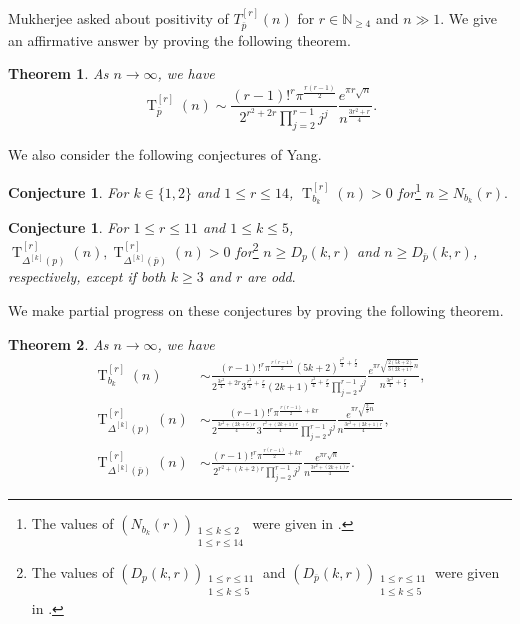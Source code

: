 \documentclass[11pt,reqno,a4paper]{amsart}
\renewcommand{\(}{\left\(}
\renewcommand{\)}{\right\)}
\newcommand{\pa}[2]{\left(\frac{#1}{#2}\right)}
\numberwithin{equation}{section}
\theoremstyle{plain}
\newtheorem{theorem}{Theorem}[section]
\theoremstyle{definition} %
\newcounter{specialstatement}
\newtheorem{conjecture}[specialstatement]{Conjecture}
\numberwithin{equation}{section}
\begin{document}
Mukherjee \cite[Problem 4.1]{MDet} asked about positivity of $T^{[r]}_{\overline{p}}(n)$ for $r\in \mathbb{N}_{\ge 4}$ and $n\!\gg\!1$. We give an affirmative answer by proving the following theorem.
\begin{theorem}\label{detopn}
	As $n\to \infty$, we have 
	\[
	\operatorname{T}^{[r]}_{\overline{p}}(n)\sim %
	\frac{(r-1)!^r\pi^{\frac{r(r-1)}{2}}}{2^{r^2+2r}\prod_{j=2}^{r-1}j^{j}}\frac{e^{\pi r\sqrt{n}}}{n^{\frac{3r^2+r}{4}}}.
	\]
\end{theorem}
 We also consider the following conjectures of Yang. %
\begin{conjecture}\cite[Conjecture 6.3]{Yang1}\label{Detconj3}
{\it For $k\!\in\!\{1,2\}$ and $1\!\le\!r\!\le\!14$, $\operatorname{T}^{[r]}_{b_k}(n)>0$ for}\hspace{0.05 cm}\footnote{The values of $(N_{b_k}(r))_{\substack{1\le k\le 2\\1\le r\le 14}}$ were given in \cite[Conjecture 6.3]{Yang1}.} $n\ge N_{b_k}(r)$.	
\end{conjecture}
\begin{conjecture}\cite[Conjecture 5.1 (2)]{Yang}\label{Detconj4}
{\it For $1\le r\le 11$ and $1\le k\le 5$, $\operatorname{T}^{[r]}_{\Delta^{[k]}(p)}(n), \operatorname{T}^{[r]}_{\Delta^{[k]}(\overline{p})}(n)>0$ for}\footnote{The values of $(D_p(k,r))_{\substack{1\le r\le 11\\1\le k\le 5}}$ and $(D_{\overline{p}}(k,r))_{\substack{1\le r\le 11\\1\le k\le 5}}$ were given in \cite[Table 3 and Table 4]{Yang}.} {\it $n\ge D_p(k,r)$ and $n\ge D_{\overline{p}}(k,r)$, respectively, except if both $k\ge 3$ and $r$ are odd}.
\end{conjecture}
We make partial progress on these conjectures by proving the following theorem. 
\begin{theorem}\label{detbpn}
As $n\to \infty$, we have 
\begin{align*}
\operatorname{T}^{[r]}_{b_k}(n)&\sim \frac{(r-1)!^r\pi^{\frac{r(r-1)}{2}} (5k+2)^{\frac{r^2}{4}+\frac r2}}{2^{\frac{3r^2}{4}+2r}3^{\frac{r^2}{4}+\frac r2}(2k+1)^{\frac{r^2}{4}+\frac r2}\prod_{j=2}^{r-1}j^{j}}
\frac{e^{\pi r\sqrt{\frac{2(5k+2)}{3(2k+1)}n}}}{n^{\frac{3r^2}{4}+\frac r2}},\\
\operatorname{T}^{[r]}_{\Delta^{[k]}(p)}(n)&\sim \frac{(r-1)!^r\pi^{\frac{r(r-1)}{2}+kr}}{2^{\frac{3r^2+\left(2k+5\right)r}{4}}3^{\frac{r^2+(2k+1)r}{4}}\prod_{j=2}^{r-1}j^{j}} %
\frac{e^{\pi r\sqrt{\frac{2}{3}n}}}{n^{\frac{3r^2+(2k+1)r}{4}}},\\
\operatorname{T}^{[r]}_{\Delta^{[k]}(\overline{p})}(n)&\sim \frac{(r-1)!^r\pi^{\frac{r(r-1)}{2}+kr}}{2^{r^2+(k+2)r}\prod_{j=2}^{r-1}j^{j}} \frac{e^{\pi r\sqrt{n}}}{n^{\frac{3r^2+(2k+1)r}{4}}}.
\end{align*}
\end{theorem}
\end{document}
